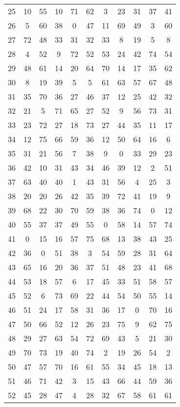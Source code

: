 \begin{table}
\begin{tabular}{c c c c c c c c c c c }
25 & 10 & 55 & 10 & 71 & 62 & 3 & 23 & 31 & 37 & 41 \\
26 & 5 & 60 & 38 & 0 & 47 & 11 & 69 & 49 & 3 & 60 \\
27 & 72 & 48 & 33 & 31 & 32 & 33 & 8 & 19 & 5 & 8 \\
28 & 4 & 52 & 9 & 72 & 52 & 53 & 24 & 42 & 74 & 54 \\
29 & 48 & 61 & 14 & 20 & 64 & 70 & 14 & 17 & 35 & 62 \\
30 & 8 & 19 & 39 & 5 & 5 & 61 & 63 & 57 & 67 & 48 \\
31 & 35 & 70 & 36 & 27 & 46 & 37 & 12 & 25 & 42 & 32 \\
32 & 21 & 5 & 71 & 65 & 27 & 52 & 9 & 56 & 73 & 31 \\
33 & 23 & 72 & 27 & 18 & 73 & 27 & 44 & 35 & 11 & 17 \\
34 & 12 & 75 & 66 & 59 & 36 & 12 & 50 & 64 & 16 & 6 \\
35 & 31 & 21 & 56 & 7 & 38 & 9 & 0 & 33 & 29 & 23 \\
36 & 42 & 10 & 31 & 43 & 34 & 46 & 39 & 12 & 2 & 51 \\
37 & 63 & 40 & 40 & 1 & 43 & 31 & 56 & 4 & 25 & 3 \\
38 & 20 & 20 & 26 & 42 & 35 & 39 & 72 & 41 & 19 & 9 \\
39 & 68 & 22 & 30 & 70 & 59 & 38 & 36 & 74 & 0 & 12 \\
40 & 55 & 37 & 37 & 49 & 55 & 0 & 58 & 14 & 57 & 74 \\
41 & 0 & 15 & 16 & 57 & 75 & 68 & 13 & 38 & 43 & 25 \\
42 & 36 & 0 & 51 & 38 & 3 & 54 & 59 & 28 & 31 & 64 \\
43 & 65 & 16 & 20 & 36 & 37 & 51 & 48 & 23 & 41 & 68 \\
44 & 53 & 18 & 57 & 6 & 17 & 45 & 33 & 51 & 58 & 57 \\
45 & 52 & 6 & 73 & 69 & 22 & 44 & 54 & 50 & 55 & 14 \\
46 & 51 & 24 & 17 & 58 & 31 & 36 & 17 & 0 & 70 & 16 \\
47 & 50 & 66 & 52 & 12 & 26 & 23 & 75 & 9 & 62 & 75 \\
48 & 29 & 27 & 63 & 54 & 72 & 69 & 43 & 5 & 21 & 30 \\
49 & 70 & 73 & 19 & 40 & 74 & 2 & 19 & 26 & 54 & 2 \\
50 & 47 & 57 & 70 & 16 & 61 & 55 & 34 & 45 & 18 & 13 \\
51 & 46 & 71 & 42 & 3 & 15 & 43 & 66 & 44 & 59 & 36 \\
52 & 45 & 28 & 47 & 4 & 28 & 32 & 67 & 58 & 61 & 61 \\

\end{tabular}
\end{table}
